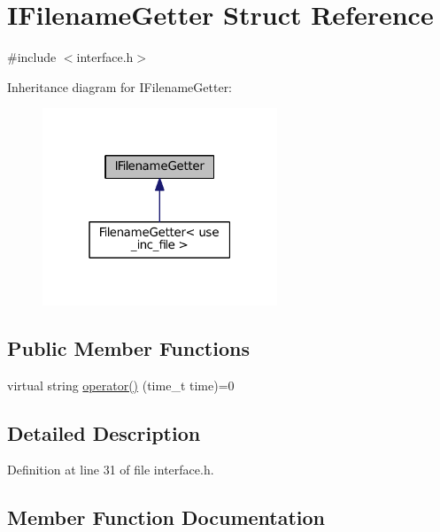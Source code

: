 \hypertarget{struct_i_filename_getter}{}\section{I\+Filename\+Getter Struct Reference}
\label{struct_i_filename_getter}


{\ttfamily \#include $<$interface.\+h$>$}



Inheritance diagram for I\+Filename\+Getter\+:
\nopagebreak
\begin{figure}[H]
\begin{center}
\leavevmode
\includegraphics[width=199pt]{struct_i_filename_getter__inherit__graph}
\end{center}
\end{figure}
\subsection*{Public Member Functions}
\begin{DoxyCompactItemize}
\item 
virtual string \hyperlink{struct_i_filename_getter_a91494380c214e12bd0e6bf875c0f5a0d}{operator()} (time\+\_\+t time)=0
\end{DoxyCompactItemize}


\subsection{Detailed Description}


Definition at line 31 of file interface.\+h.



\subsection{Member Function Documentation}

